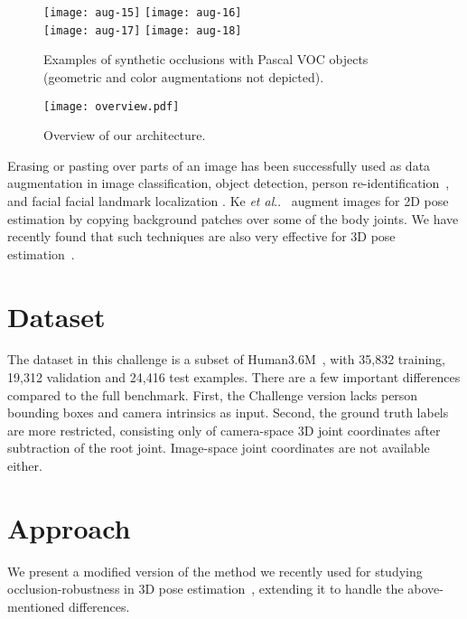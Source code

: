 \documentclass[10pt,twocolumn,letterpaper]{article}
\makeatletter
\DeclareRobustCommand\onedot{\futurelet\@let@token\@onedot}
\def\@onedot{\ifx\@let@token.\else.\null\fi\xspace}
\def\etal{\emph{et al}\onedot}
\newcommand{\PAR}[1]{\vskip4pt \noindent {\bf #1~}}
\makeatother
\begin{document}
\begin{figure}[tpb]
\centering
\texttt{[image: aug-15]} \hspace{0.5mm}
\texttt{[image: aug-16]} \vspace{1.5mm} \\
\texttt{[image: aug-17]} \hspace{0.5mm}
\texttt{[image: aug-18]}
\caption{Examples of synthetic occlusions with Pascal VOC objects (geometric and color augmentations not depicted).}
\label{fig:occlusion_types}
\end{figure}
\begin{figure*}[t]
\centering
\texttt{[image: overview.pdf]}
\caption{Overview of our architecture.}
\label{fig:overview}
\end{figure*}

\PAR{Occlusion Augmentation.}
Erasing or pasting over parts of an image has been successfully used as data augmentation in image classification, object detection, person re-identification~\cite{Zhong17arXiv}\cite{DeVries17arXiv}\cite{Dwibedi17ICCV}\cite{Dvornik18ECCV}\cite{Georgakis17arXiv}, and facial facial landmark localization \cite{Yuen17TIV}. Ke \etal~\cite{Ke18arXiv} augment images for 2D pose estimation by copying background patches over some of the body joints. We have recently found that such techniques are also very effective for 3D pose estimation~\cite{Sarandi18IROSW}.

\section{Dataset}
\label{sec:dataset}
The dataset in this challenge is a subset of Human3.6M~\cite{Ionescu14PAMI}\cite{Ionescu11ICCV}, with 35,832 training, 19,312 validation and 24,416 test examples. There are a few important differences compared to the full benchmark. First, the Challenge version lacks person bounding boxes and camera intrinsics as input. Second, the ground truth labels are more restricted, consisting only of camera-space 3D joint coordinates after subtraction of the root joint. Image-space joint coordinates are not available either.

\section{Approach}
\label{sec:approach}
We present a modified version of the method we recently used for studying occlusion-robustness in 3D pose estimation~\cite{Sarandi18IROSW}, extending it to handle the above-mentioned differences.
\end{document}
